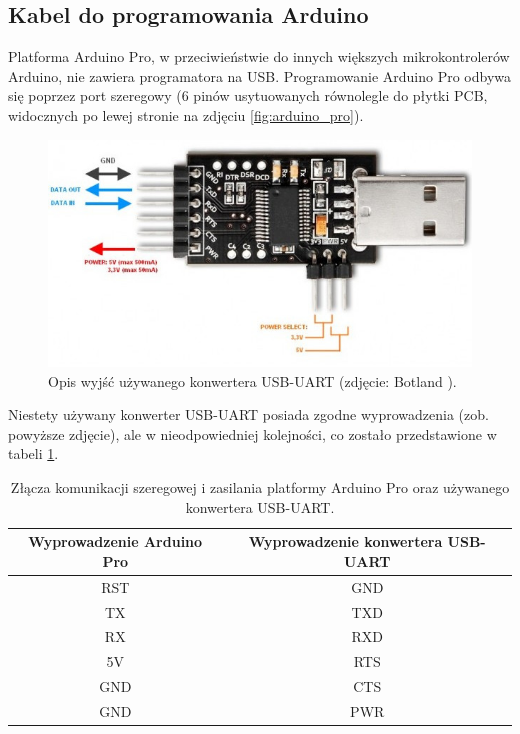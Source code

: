 \subsection{Kabel do programowania Arduino}
\label{subsec:kabel_do_programowania_arduino}

Platforma Arduino Pro, w przeciwieństwie do innych większych mikrokontrolerów Arduino, nie zawiera programatora na USB. Programowanie Arduino Pro odbywa się poprzez port szeregowy (6 pinów usytuowanych równolegle do płytki PCB, widocznych po lewej stronie na zdjęciu \ref{fig:arduino_pro}).

\begin{figure}[h]
	\centering
	\includegraphics[scale=0.5]{pics/konwerter-usb-uart-ft232-33-5v.jpg}
	\caption{\label{fig:arduino_ide}Opis wyjść używanego konwertera USB-UART (zdjęcie: Botland \cite{KonwerterBotland}).}
\end{figure}

Niestety używany konwerter USB-UART posiada zgodne wyprowadzenia (zob. powyższe zdjęcie), ale w nieodpowiedniej kolejności, co zostało przedstawione w tabeli \ref{tab:piny}.

\begin{table}[h]
    \centering
    
    \begin{threeparttable}
        \caption{Złącza komunikacji szeregowej i zasilania platformy Arduino Pro oraz używanego konwertera USB-UART.}
        \label{tab:piny}
        
        \begin{tabular}{cc}
            \toprule
            Wyprowadzenie Arduino Pro & Wyprowadzenie konwertera USB-UART \\
            \midrule
            RST & GND \\
            TX & TXD \\
            RX & RXD \\
            5V & RTS \\
            GND & CTS \\
            GND & PWR \\
            \bottomrule
        \end{tabular}
        
    \end{threeparttable}
\end{table}

